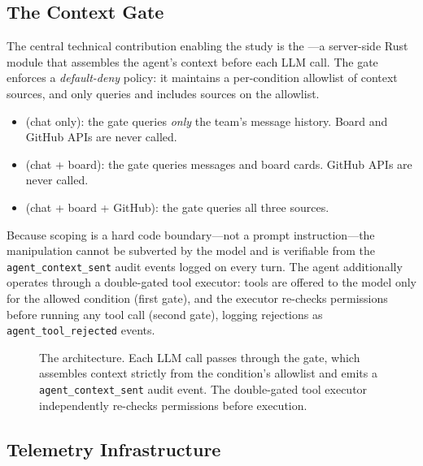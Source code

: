 \subsection{The Context Gate}
\label{sec:system:gate}

The central technical contribution enabling the study is the \ContextGate---a
server-side Rust module that assembles the agent's context before each LLM
call. The gate enforces a \emph{default-deny} policy: it maintains a
per-condition allowlist of context sources, and only queries and includes
sources on the allowlist.

\begin{itemize}
  \item \textbf{\CI} (chat only): the gate queries \emph{only} the team's
    message history. Board and GitHub APIs are never called.
  \item \textbf{\CII} (chat + board): the gate queries messages and board
    cards. GitHub APIs are never called.
  \item \textbf{\CIII} (chat + board + GitHub): the gate queries all three
    sources.
\end{itemize}

Because scoping is a hard code boundary---not a prompt instruction---the
manipulation cannot be subverted by the model and is verifiable from the
\texttt{agent\_context\_sent} audit events logged on every turn. The agent
additionally operates through a double-gated tool executor: tools are offered
to the model only for the allowed condition (first gate), and the executor
re-checks permissions before running any tool call (second gate), logging
rejections as \texttt{agent\_tool\_rejected} events.

\begin{figure}[h]
  \centering
  \fbox{\rule{0pt}{4cm}\rule{0.8\linewidth}{0pt}}
  \caption{The \ContextGate architecture. Each LLM call passes through the gate,
    which assembles context strictly from the condition's allowlist and emits a
    \texttt{agent\_context\_sent} audit event. The double-gated tool executor
    independently re-checks permissions before execution.}
  \label{fig:gate}
\end{figure}

\subsection{Telemetry Infrastructure}
\label{sec:system:telemetry}

